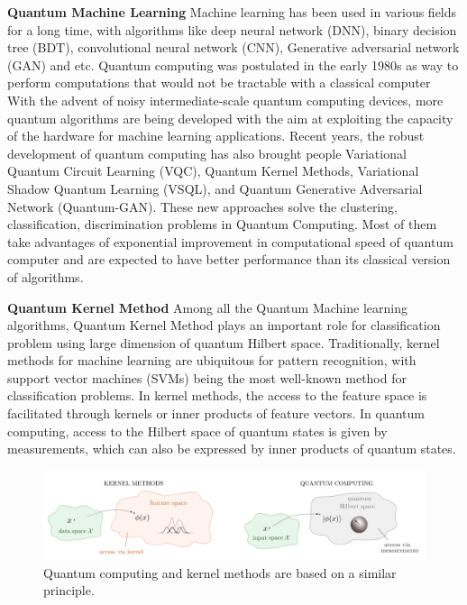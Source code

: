\documentclass{article}
\begin{document}
\textbf{Quantum Machine Learning} Machine learning has been used in various fields for a long time, 
with algorithms like deep neural network (DNN), binary decision tree (BDT),
convolutional neural network (CNN), Generative adversarial network (GAN) and 
etc. Quantum computing was postulated in the early 1980s as way to 
perform computations that would not be tractable with a classical computer
With the advent of noisy intermediate-scale quantum computing devices, 
more quantum algorithms are being developed with the aim at exploiting 
the capacity of the hardware for machine learning applications. Recent years, 
the robust development of quantum computing has also brought people 
Variational Quantum Circuit Learning (VQC), Quantum Kernel Methods, 
Variational Shadow Quantum Learning (VSQL), and Quantum Generative 
Adversarial Network (Quantum-GAN). These new approaches solve 
the clustering, classification, discrimination problems in 
Quantum Computing. Most of them take advantages of exponential 
improvement in computational speed of quantum computer and are expected 
to have better performance than its classical version of algorithms. 

\textbf{Quantum Kernel Method} Among all the 
Quantum Machine learning algorithms, Quantum Kernel 
Method plays an important role for classification problem using 
large dimension of quantum Hilbert space. Traditionally, 
kernel methods for machine learning 
are ubiquitous for pattern recognition, 
with support vector machines (SVMs) being the most well-known method 
for classification problems. 
In kernel methods, the access to the feature space is facilitated 
through kernels or inner products of feature vectors. 
In quantum computing, access to the Hilbert space of quantum states
 is given by measurements, which can also be expressed 
 by inner products of quantum states.

\begin{figure}[h]
  \begin{center}
    \includegraphics[width=0.85 \textwidth]{kernel2.png}
  \end{center}
  \caption{Quantum computing and kernel methods are based on a similar principle. }
\end{figure}
\end{document}
